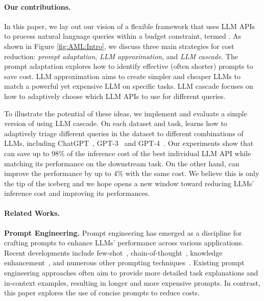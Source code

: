 \documentclass{article}
\begin{document}
\paragraph{Our contributions.} In this paper, we lay out our vision of a flexible framework that uses LLM APIs to process natural language queries within a  budget constraint, termed \systemFGPT{}. 
As shown in Figure \ref{fig:AML:Intro}, we discuss three main strategies for cost reduction: \textit{prompt adaptation},    \textit{LLM approximation},  
and \textit{LLM cascade}.
The prompt adaptation explores how to identify effective (often shorter)  prompts to save cost. 
LLM approximation aims to create simpler and cheaper LLMs to match a powerful yet expensive LLM on  specific  tasks.  
LLM cascade focuses on how to adaptively choose which LLM APIs to use for different queries. 

To illustrate the potential of these ideas, we  implement and evaluate a simple version of \systemFGPT{} using LLM cascade. On each dataset and task, \systemFGPT{} learns how to adaptively triage different queries in the dataset to different combinations of LLMs, including ChatGPT~\cite{ChatGPTAnn}, GPT-3~\cite{brown2020language} and GPT-4~\cite{GPT4TechReport}. Our experiments show that \systemFGPT{} can save up to 98\% of the inference cost of the best individual LLM API while matching its  performance on the downstream task.
On the other hand, \systemFGPT{} can improve the performance by up to 4\% with the same cost.
We believe this is only the tip of the iceberg and we hope \systemFGPT{} opens a new window toward reducing LLMs' inference cost and improving its performances.

 

\paragraph{Related Works.} \textbf{Prompt Engineering.} Prompt engineering has emerged as a discipline for crafting prompts to enhance LLMs' performance across various applications. Recent developments include few-shot~\cite{brown2020language}, chain-of-thought~\cite{wei2022chain}, knowledge enhancement~\cite{liu2021generated,khattab2022demonstrate}, and numerous other prompting techniques~\cite{mialon2023augmented,khot2022decomposed,zhou2022least,dua2022successive}. Existing prompt engineering approaches often aim to provide more detailed task explanations and in-context examples, resulting in longer and more expensive prompts. In contrast, this paper explores the use of concise prompts to reduce costs.
\end{document}
